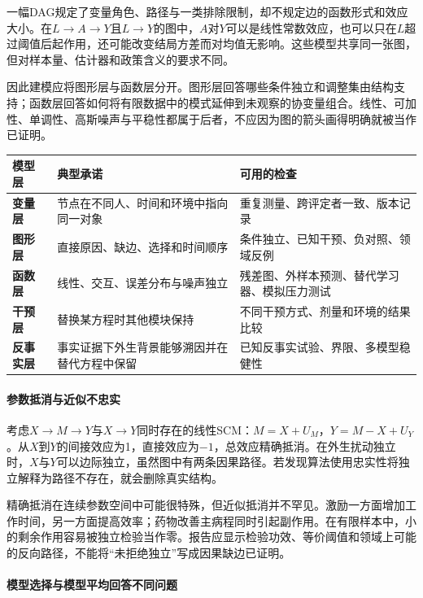 一幅DAG规定了变量角色、路径与一类排除限制，却不规定边的函数形式和效应大小。在$L\rightarrow A\rightarrow Y$且$L\rightarrow Y$的图中，$A$对$Y$可以是线性常数效应，也可以只在$L$超过阈值后起作用，还可能改变结局方差而对均值无影响。这些模型共享同一张图，但对样本量、估计器和政策含义的要求不同。

因此建模应将图形层与函数层分开。图形层回答哪些条件独立和调整集由结构支持；函数层回答如何将有限数据中的模式延伸到未观察的协变量组合。线性、可加性、单调性、高斯噪声与平稳性都属于后者，不应因为图的箭头画得明确就被当作已证明。

\begin{center}
\small
\begin{tabularx}{\textwidth}{>{\bfseries}p{2.1cm}X X}
\toprule
模型层 & 典型承诺 & 可用的检查\\
\midrule
变量层 & 节点在不同人、时间和环境中指向同一对象 & 重复测量、跨评定者一致、版本记录\\
图形层 & 直接原因、缺边、选择和时间顺序 & 条件独立、已知干预、负对照、领域反例\\
函数层 & 线性、交互、误差分布与噪声独立 & 残差图、外样本预测、替代学习器、模拟压力测试\\
干预层 & 替换某方程时其他模块保持 & 不同干预方式、剂量和环境的结果比较\\
反事实层 & 事实证据下外生背景能够溯因并在替代方程中保留 & 已知反事实试验、界限、多模型稳健性\\
\bottomrule
\end{tabularx}
\end{center}

\paragraph{参数抵消与近似不忠实}

考虑$X\rightarrow M\rightarrow Y$与$X\rightarrow Y$同时存在的线性SCM：$M=X+U_M$，$Y=M-X+U_Y$。从$X$到$Y$的间接效应为1，直接效应为$-1$，总效应精确抵消。在外生扰动独立时，$X$与$Y$可以边际独立，虽然图中有两条因果路径。若发现算法使用忠实性将独立解释为路径不存在，就会删除真实结构。

精确抵消在连续参数空间中可能很特殊，但近似抵消并不罕见。激励一方面增加工作时间，另一方面提高效率；药物改善主病程同时引起副作用。在有限样本中，小的剩余作用容易被独立检验当作零。报告应显示检验功效、等价阈值和领域上可能的反向路径，不能将“未拒绝独立”写成因果缺边已证明。

\paragraph{模型选择与模型平均回答不同问题}

